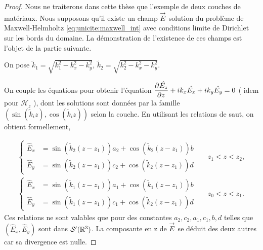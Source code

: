     \begin{proof}
      Nous ne traiterons dans cette thèse que l'exemple de deux couches de matériaux.
      Nous supposons qu'il existe un champ \(\vE\) solution du problème de Maxwell-Helmholtz \eqref{eq:unicite:maxwell_int} avec conditions limite de Dirichlet sur les bords du domaine.
      La démonstration de l'existence de ces champs est l'objet de la partie suivante.

      \newcommand{\kk}{\tilde{k}}

      On pose \(\kk_1 = \sqrt{k_1^2 - k_x^2 - k_y^2}\),  \(\kk_2 = \sqrt{k_2^2 - k_x^2 - k_y^2}\).

      On couple les équations pour obtenir l'équation \(\ddr{z}{\hat{E_z}} + ik_x \hat{E_x} + ik_y\hat{E_y} = 0\) ( idem pour \(\mathcal{H}_z\) ), dont les solutions sont données par la famille \((\sin(\kk_i z),\cos(\kk_i z))\) selon la couche.
      En utilisant les relations de saut, on obtient formellement,

      \begin{align*}
        \left\lbrace
        \begin{aligned}
          \hat{E}_x &= \sin(\kk_2(z-z_1))a_2 +  \cos(\kk_2(z-z_1))b
          \\
          \hat{E}_y &= \sin(\kk_2(z-z_1))c_2 +  \cos(\kk_2(z-z_1))d
        \end{aligned}
        \right. && z_1 < z < z_2,
        \\
        \left\lbrace
        \begin{aligned}
          \hat{E}_x &= \sin(\kk_1(z-z_1))a_1 +  \cos(\kk_1(z-z_1))b
          \\
          \hat{E}_y &= \sin(\kk_1(z-z_1))c_1 +  \cos(\kk_2(z-z_1))d
        \end{aligned}
        \right. && z_0 < z < z_1.
      \end{align*}
      Ces relations ne sont valables que pour des constantes \(a_2,c_2,a_1,c_1,b,d\) telles que \((\hat{E}_x,\hat{E}_y)\) sont dans \(\mathcal{S}'(\RR^3)\).
      La composante en z de \(\vE\) se déduit des deux autres car sa divergence est nulle.



\end{proof}
